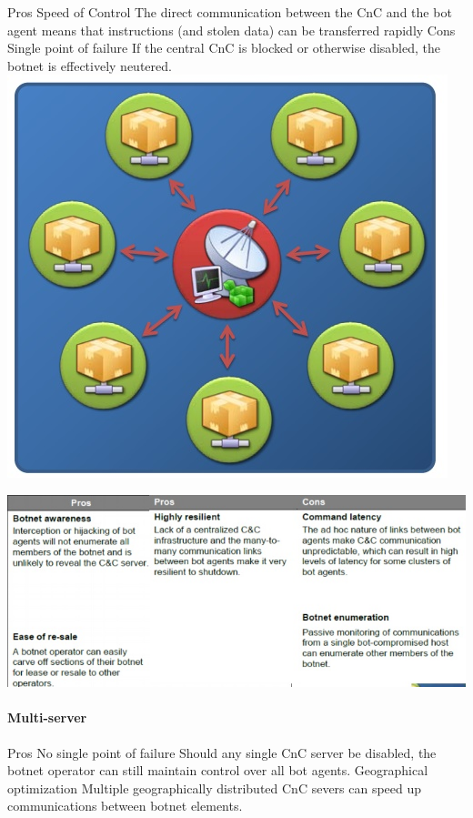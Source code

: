    Pros 
Speed of Control
The direct communication between the CnC and the bot agent means that instructions (and stolen data) can be transferred rapidly
    Cons
Single point of failure
If the central CnC is blocked or otherwise disabled, the botnet is effectively neutered.\\
\includegraphics[scale=1]{img/star_topo.jpg}

\includegraphics[scale=1]{img/centralized_topo}

\paragraph{Multi-server}
    Pros 
No single point of failure
Should any single CnC server be disabled, the botnet operator can still maintain control over all bot agents.
Geographical optimization
Multiple geographically distributed CnC severs can speed up communications between botnet elements.

